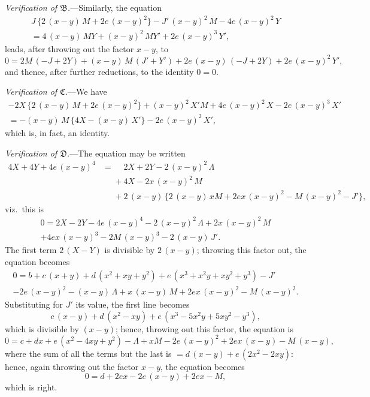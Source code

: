 \documentclass[11pt,a4paper]{book}
\begin{document}
\textit{Verification of $\mathfrak{B}$.}---Similarly, the equation
\begin{multline*}
J\,\{2\,(x-y)\,M + 2e\,(x-y)^2\} - J'\,(x-y)^2\,M - 4e\,(x-y)^2\,Y \\
= 4\,(x-y)\,MY + (x-y)^2\,MY' + 2e\,(x-y)^3\,Y',
\end{multline*}
leads, after throwing out the factor $x-y$, to
\[
0 = 2M\,(-J+2Y) + (x-y)\,M\,(J'+Y') + 2e\,(x-y)\,(-J+2Y) + 2e\,(x-y)^2\,Y',
\]
and thence, after further reductions, to the identity $0=0$.

\vspace{2ex}
\noindent\textit{Verification of $\mathfrak{C}$.}---We have
\begin{multline*}
-2X\,\{2\,(x-y)\,M + 2e\,(x-y)^2\} + (x-y)^2\,X'M + 4e\,(x-y)^2\,X - 2e\,(x-y)^3\,X' \\
= -(x-y)\,M\,\{4X - (x-y)\,X'\} - 2e\,(x-y)^2\,X',
\end{multline*}
which is, in fact, an identity.

\textit{Verification of $\mathfrak{D}$.}---The equation may be written
\begin{align*}
4X + 4Y + 4e\,(x-y)^4 &= \phantom{+}2X + 2Y - 2\,(x-y)^2\,\Lambda \\
&\phantom{=} + 4X - 2x\,(x-y)^2\,M \\
&\phantom{=} + 2\,(x-y)\,\{2\,(x-y)\,xM + 2ex\,(x-y)^2 - M\,(x-y)^2 - J'\},
\end{align*}
viz.\ this is
\begin{multline*}
0 = 2X - 2Y - 4e\,(x-y)^4 - 2\,(x-y)^2\,\Lambda + 2x\,(x-y)^2\,M \\
+ 4ex\,(x-y)^3 - 2M\,(x-y)^3 - 2\,(x-y)\,J'.
\end{multline*}
The first term $2\,(X-Y)$ is divisible by $2\,(x-y)$; throwing this factor out, the equation becomes
\begin{multline*}
0 = b + c\,(x+y) + d\,(x^2+xy+y^2) + e\,(x^3+x^2y+xy^2+y^3) - J' \\
- 2e\,(x-y)^2 - (x-y)\,\Lambda + x\,(x-y)\,M + 2ex\,(x-y)^2 - M\,(x-y)^2.
\end{multline*}
Substituting for $J'$ its value, the first line becomes
\[
c\,(x-y) + d\,(x^2-xy) + e\,(x^3-5x^2y+5xy^2-y^3),
\]
which is divisible by $(x-y)$; hence, throwing out this factor, the equation is
\[
0 = c + dx + e\,(x^2-4xy+y^2) - \Lambda + xM - 2e\,(x-y)^2 + 2ex\,(x-y) - M\,(x-y),
\]
where the sum of all the terms but the last is $= d\,(x-y) + e\,(2x^2-2xy)$: hence, again throwing out the factor $x-y$, the equation becomes
\[
0 = d + 2ex - 2e\,(x-y) + 2ex - M,
\]
which is right.
\end{document}
